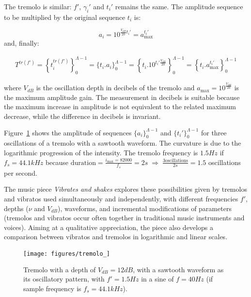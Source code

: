 The tremolo is similar: $f'$, $\gamma_i'$ and $t_i'$ remains the same.
The amplitude sequence to be multiplied by the original sequence $t_i$ is:

\begin{equation}\label{trA}
 a_i=10^{\frac{V_{dB}}{20}t_i' } = a_{\text{max}}^{t_i'}
\end{equation}
\noindent and, finally: 

\begin{equation}\label{trT}
\begin{split}
 T^{tr(f')}=\left \{ t_i^{tr(f')} \right \}_0^{\Lambda-1}=\{ t_i . a_i \}_0^{\Lambda-1}= \left \{t_i .10^{t_i' \frac{V_{dB}}{20}}    \right \}_0^{\Lambda-1}=\left\{t_i . a_{\text{max}}^{t_i'} \right\}_0^{\Lambda-1}
\end{split}
\end{equation}

\noindent where $V_{dB}$ is the oscillation depth in decibels of the tremolo and $a_{\text{max}}=10^{\frac{V_{dB}}{20}}$ is the maximum amplitude gain. The measurement in decibels is suitable because the maximum increase in amplitude is not equivalent to the related maximum decrease, while the difference in decibels is invariant.

Figure~\ref{fig:tremolo} shows the amplitude of sequences $\{a_i\}_0^{\Lambda-1}$ and $\{t_i'\}_0^{\Lambda-1}$ for three oscillations of a tremolo with a sawtooth waveform. The curvature is due to the logarithmic progression of the intensity. The tremolo frequency is $1.5Hz$ if $f_s=44.1kHz$ because $\text{duration} = \frac{i_{\text{max}}=82000}{f_s}= 2s \; \Rightarrow \; \frac{3\text{oscillations}}{2s}=1.5$ oscillations per second.

The music piece \emph{Vibrates and shakes} explores these possibilities given by tremolos and vibratos
used simultaneously and independently, with different frequencies $f'$, depths ($\nu$ and $V_{dB}$),
waveforms, and incremental modifications of parameters
(tremolos and vibratos occur often together in traditional music instruments and voices). Aiming at a qualitative appreciation, the piece also develops a comparison between vibratos and tremolos in logarithmic and linear scales.~\cite{MASSA}

\begin{figure}
     \centering
         \texttt{[image: figures/tremolo\_]}
     \caption{Tremolo with a depth of $V_{dB}=12dB$, with a sawtooth waveform as its oscillatory pattern, with $f'=1.5Hz$ in a sine of $f=40Hz$ (if sample frequency is $f_s=44.1kHz$).}
         \label{fig:tremolo}
\end{figure}

